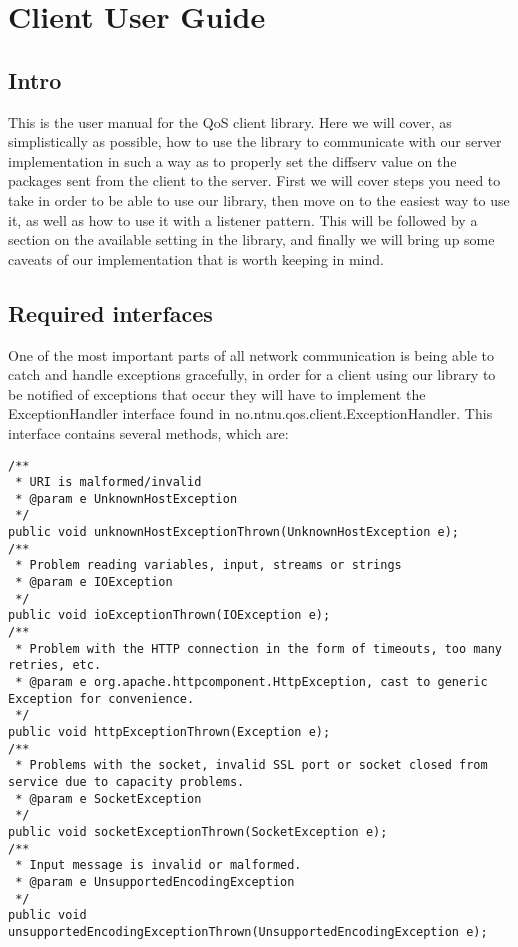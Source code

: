 \section{Client User Guide}\label{Client User Guide} 
\subsection{Intro}\label{userguideIntro}
This is the user manual for the QoS client library. Here we will cover, as simplistically as possible, how to use the library to communicate with our server implementation in such a way as to properly set the diffserv value on the packages sent from the client to the server.
First we will cover steps you need to take in order to be able to use our library, then move on to the easiest way to use it, as well as how to use it with a listener pattern. This will be followed by a section on the available setting in the library, and finally we will bring up some caveats of our implementation that is worth keeping in mind.

\subsection{Required interfaces}\label{userguideReqiredInterfaces}
One of the most important parts of all network communication is being able to catch and handle exceptions gracefully, in order for a client using our library to be notified of exceptions that occur they will have to implement the ExceptionHandler interface found in no.ntnu.qos.client.ExceptionHandler. This interface contains several methods, which are:

\lstset{language=java}
\lstset{frame=single}
\lstset{breaklines=true}
\begin{lstlisting}[caption={ExceptionHandler interface}, label=userguideExceptionHandler]
/**
 * URI is malformed/invalid
 * @param e UnknownHostException
 */
public void unknownHostExceptionThrown(UnknownHostException e);
/**
 * Problem reading variables, input, streams or strings
 * @param e IOException
 */
public void ioExceptionThrown(IOException e);
/**
 * Problem with the HTTP connection in the form of timeouts, too many retries, etc.
 * @param e org.apache.httpcomponent.HttpException, cast to generic Exception for convenience.
 */
public void httpExceptionThrown(Exception e);
/**
 * Problems with the socket, invalid SSL port or socket closed from service due to capacity problems.
 * @param e SocketException
 */
public void socketExceptionThrown(SocketException e);
/**
 * Input message is invalid or malformed.
 * @param e UnsupportedEncodingException
 */
public void unsupportedEncodingExceptionThrown(UnsupportedEncodingException e);
\end{lstlisting}

